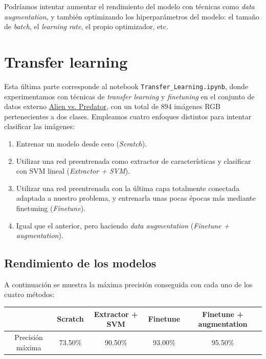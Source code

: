 \documentclass[11pt]{article}
\begin{document}
Podríamos intentar aumentar el rendimiento del modelo con técnicas como \textit{data augmentation}, y también optimizando los hiperparámetros del modelo: el tamaño de \textit{batch}, el \textit{learning rate}, el propio optimizador, etc.
\newpage

\section{Transfer learning}

Esta última parte corresponde al notebook \verb|Transfer_Learning.ipynb|, donde experimentamos con técnicas de \textit{transfer learning} y \textit{finetuning} en el conjunto de datos externo \href{https://www.kaggle.com/pmigdal/alien-vs-predator-images}{Alien vs. Predator}, con un total de 894 imágenes RGB pertenecientes a dos clases. Empleamos cuatro enfoques distintos para intentar clasificar las imágenes:

\begin{enumerate}
  \item Entrenar un modelo desde cero (\textit{Scratch}).
  \item Utilizar una red preentrenada como extractor de características y clasificar con SVM lineal (\textit{Extractor + SVM}).
  \item Utilizar una red preentrenada con la última capa totalmente conectada adaptada a nuestro problema, y entrenarla unas pocas épocas más mediante finetuning (\textit{Finetune}).
  \item Igual que el anterior, pero haciendo \textit{data augmentation} (\textit{Finetune + augmentation}).
\end{enumerate}

\subsection*{Rendimiento de los modelos}

A continuación se muestra la máxima precisión conseguida con cada uno de los cuatro métodos:

\begin{table}[h!]
  \centering
  \begin{tabular}{c|cccc}
    & Scratch & Extractor + SVM & Finetune & Finetune + augmentation\\
    \hline
    Precisión máxima & 73.50\% & 90.50\% & 93.00\% & 95.50\%
  \end{tabular}
\end{table}
\end{document}
